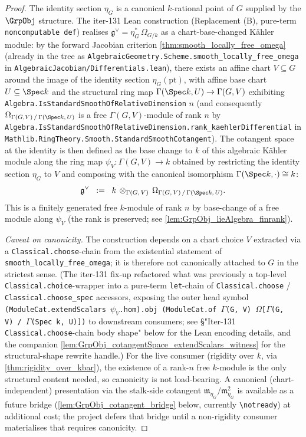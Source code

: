 \begin{proof}

\leanok
  The identity section \(\eta_G\) is a canonical \(k\)-rational point of \(G\) supplied by the \(\GrpObj\) structure. The iter-131 Lean construction (Replacement (B), pure-term \texttt{noncomputable def}) realises \(\mathfrak g^{\vee} = \eta_G^{*}\,\Omega_{G/k}\) as a chart-base-changed Kähler module: by the forward Jacobian criterion \cref{thm:smooth_locally_free_omega} (already in the tree as \texttt{AlgebraicGeometry.Scheme.smooth\_locally\_free\_omega} in \texttt{AlgebraicJacobian/Differentials.lean}), there exists an affine chart \(V \subseteq G\) around the image of the identity section \(\eta_G(\mathrm{pt})\), with affine base chart \(U \subseteq \Spec k\) and the structural ring map \(\Gamma(\Spec k, U) \to \Gamma(G, V)\) exhibiting \texttt{Algebra.IsStandardSmoothOfRelativeDimension} \(n\) (and consequently \(\Omega_{\Gamma(G,V) \,/\, \Gamma(\Spec k,\,U)}\) is a free \(\Gamma(G, V)\)-module of rank \(n\) by \texttt{Algebra.IsStandardSmoothOfRelativeDimension.rank\_kaehlerDifferential} in \texttt{Mathlib.RingTheory.Smooth.StandardSmoothCotangent}). The cotangent space at the identity is then defined as the base change to \(k\) of this algebraic Kähler module along the ring map \(\psi_V \colon \Gamma(G, V) \to k\) obtained by restricting the identity section \(\eta_G\) to \(V\) and composing with the canonical isomorphism \(\Gamma(\Spec k, \cdot) \cong k\):
  \[
    \mathfrak g^{\vee} \;\;:=\;\; k \,\otimes_{\Gamma(G,\,V)}\, \Omega_{\Gamma(G,\,V) \,/\, \Gamma(\Spec k,\,U)}.
  \]
  This is a finitely generated free \(k\)-module of rank \(n\) by base-change of a free module along \(\psi_V\) (the rank is preserved; see \cref{lem:GrpObj_lieAlgebra_finrank}).

  \emph{Caveat on canonicity.} The construction depends on a chart choice \(V\) extracted via a \texttt{Classical.choose}-chain from the existential statement of \texttt{smooth\_locally\_free\_omega}; it is therefore not canonically attached to \(G\) in the strictest sense. (The iter-131 fix-up refactored what was previously a top-level \texttt{Classical.choice}-wrapper into a pure-term \texttt{let}-chain of \texttt{Classical.choose} / \texttt{Classical.choose\_spec} accessors, exposing the outer head symbol \texttt{(ModuleCat.extendScalars\,\(\psi_V\).hom).obj\,(ModuleCat.of\,\(\Gamma\)(G, V)\,\(\Omega\)[\(\Gamma\)(G, V)\,/\,\(\Gamma\)(Spec k, U)])} to downstream consumers; see \S "Iter-131 \texttt{Classical.choose}-chain body shape" below for the Lean encoding details, and the companion \cref{lem:GrpObj_cotangentSpace_extendScalars_witness} for the structural-shape rewrite handle.) For the live consumer (rigidity over \(k\), via \cref{thm:rigidity_over_kbar}), the existence of a rank-\(n\) free \(k\)-module is the only structural content needed, so canonicity is not load-bearing. A canonical (chart-independent) presentation via the stalk-side cotangent \(\mathfrak m_{\eta_G}/\mathfrak m_{\eta_G}^{2}\) is available as a future bridge (\cref{lem:GrpObj_cotangent_bridge} below, currently \texttt{\textbackslash notready}) at additional cost; the project defers that bridge until a non-rigidity consumer materialises that requires canonicity.
\end{proof}

